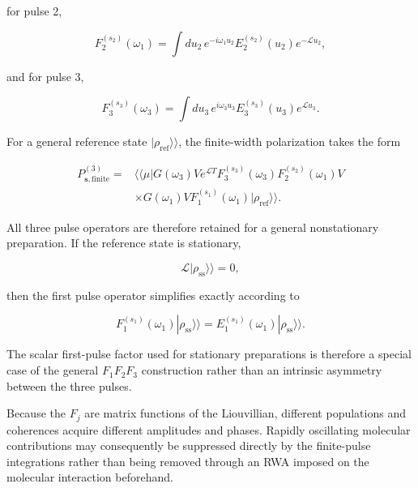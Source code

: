 \documentclass[11pt]{article}
\begin{document}
for pulse 2,

\begin{equation}
F_2^{(s_2)}(\omega_1)
=
\int du_2\,
e^{-i\omega_1u_2}
E_2^{(s_2)}(u_2)
e^{-\mathcal{L}u_2},
\end{equation}

and for pulse 3,

\begin{equation}
F_3^{(s_3)}(\omega_3)
=
\int du_3\,
e^{i\omega_3u_3}
E_3^{(s_3)}(u_3)
e^{\mathcal{L}u_3}.
\end{equation}

For a general reference state $|\rho_{\mathrm{ref}}\rangle\rangle$,
the finite-width polarization takes the form

\begin{equation}
\boxed{
\begin{aligned}
P_{\mathbf{s},\mathrm{finite}}^{(3)}
={}&
\langle\!\langle\mu|
G(\omega_3)
V
e^{\mathcal{L}T}
F_3^{(s_3)}(\omega_3)
F_2^{(s_2)}(\omega_1)
V
\\
&\times
G(\omega_1)
V
F_1^{(s_1)}(\omega_1)
|\rho_{\mathrm{ref}}\rangle\rangle .
\end{aligned}
}
\end{equation}

All three pulse operators are therefore retained for a general
nonstationary preparation. If the reference state is stationary,

\begin{equation}
\mathcal{L}
|\rho_{\mathrm{ss}}\rangle\rangle
=
0,
\end{equation}

then the first pulse operator simplifies exactly according to

\begin{equation}
F_1^{(s_1)}(\omega_1)
|\rho_{\mathrm{ss}}\rangle\rangle
=
E_1^{(s_1)}(\omega_1)
|\rho_{\mathrm{ss}}\rangle\rangle .
\end{equation}

The scalar first-pulse factor used for stationary preparations is
therefore a special case of the general $F_1F_2F_3$ construction rather
than an intrinsic asymmetry between the three pulses.

Because the $F_j$ are matrix functions of the Liouvillian, different
populations and coherences acquire different amplitudes and phases.
Rapidly oscillating molecular contributions may consequently be
suppressed directly by the finite-pulse integrations rather than being
removed through an RWA imposed on the molecular interaction
beforehand.
\end{document}
